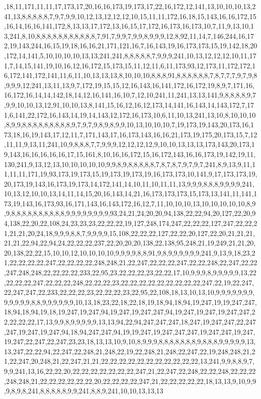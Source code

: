 ,18,11,171,11,11,17,173,17,20,16,16,173,19,173,17,22,16,172,12,141,13,10,10,10,13,241,13,8,8,8,8,8,7,9,7,9,9,10,12,13,12,12,12,10,15,11,11,172,16,18,15,143,16,16,172,15,16,14,16,16,141,172,8,13,13,17,172,13,16,15,17,172,16,173,16,173,10,7,11,9,13,10,13,241,8,10,8,8,8,8,8,8,8,8,8,8,8,7,91,7,9,9,7,9,9,8,9,9,9,12,8,92,11,14,7,146,244,16,172,19,143,244,16,15,19,18,16,16,21,171,121,16,7,16,143,19,16,173,173,15,19,142,18,20,172,14,141,5,10,10,10,10,13,13,241,241,8,8,8,8,8,7,9,9,9,241,10,13,12,12,12,10,11,171,7,14,15,141,19,10,16,12,16,172,15,173,15,11,12,11,6,11,173,93,12,173,11,172,172,16,172,141,172,141,11,6,11,10,13,13,13,8,10,10,10,8,8,8,91,8,8,8,8,8,8,7,8,7,7,7,9,7,9,8,9,9,9,12,241,13,11,13,9,7,172,19,15,15,12,16,143,16,141,172,16,172,19,8,9,7,171,16,16,172,16,14,14,142,18,14,12,16,141,16,10,7,12,10,241,11,241,13,13,141,9,8,8,8,8,9,7,9,9,10,10,13,12,91,10,10,13,8,141,15,16,12,16,12,173,14,141,16,143,14,143,172,7,171,6,141,22,172,16,143,14,19,14,143,12,172,16,173,10,6,11,10,13,241,13,10,8,10,10,10,8,9,9,8,8,8,8,8,8,8,8,8,9,7,9,7,9,8,9,8,9,9,10,13,10,10,10,7,19,173,19,143,20,173,16,173,18,16,19,143,17,12,11,7,171,143,17,16,173,143,16,16,21,173,19,175,20,173,15,7,12,11,11,9,13,11,241,10,9,8,8,8,7,7,9,9,9,12,12,12,12,9,10,10,13,13,13,173,143,20,173,19,143,16,16,16,16,16,17,15,161,8,10,16,16,172,15,16,172,143,16,16,173,19,142,19,11,130,241,9,13,12,13,10,10,10,10,10,9,9,8,9,8,8,8,8,8,7,8,7,8,7,9,7,9,7,241,8,9,13,9,11,11,11,11,171,19,93,173,19,173,15,19,173,19,173,19,16,173,173,10,141,9,17,173,173,19,20,173,19,143,16,173,19,173,14,172,141,14,10,11,10,11,11,13,9,9,9,8,8,8,9,9,9,9,241,10,13,12,10,10,13,14,11,14,15,20,16,143,14,21,16,173,173,173,15,173,13,141,11,141,173,19,143,16,173,93,16,171,143,16,143,172,16,12,7,11,10,10,10,13,10,10,10,10,10,8,9,9,8,8,8,8,8,8,8,8,8,8,9,9,9,9,9,9,9,9,93,24,21,24,20,20,94,138,22,22,94,20,127,22,20,94,138,22,20,22,108,24,23,23,23,22,22,22,19,127,248,174,247,22,22,22,127,247,22,22,21,21,21,20,24,18,9,9,9,8,8,7,9,9,9,9,15,108,22,22,22,127,22,22,20,127,22,20,21,21,21,21,21,22,94,22,94,24,22,22,22,237,22,20,20,20,138,22,138,95,248,21,19,249,21,21,20,20,138,22,22,15,10,10,12,10,10,10,10,9,9,9,9,8,8,91,9,8,9,9,9,9,9,9,241,9,13,9,18,23,21,22,22,22,22,247,22,22,22,22,248,248,21,22,247,22,22,22,247,22,22,248,22,247,22,22,247,248,248,22,22,22,22,233,22,95,23,22,22,22,23,22,22,17,10,9,9,9,8,9,9,9,9,9,13,22,22,22,22,247,22,22,22,248,22,22,22,23,22,22,22,22,22,22,22,22,22,247,22,19,22,247,22,247,247,22,233,22,22,22,23,22,22,22,23,22,95,22,108,18,13,10,13,10,9,9,9,9,9,9,9,9,9,9,9,9,8,8,9,9,9,9,9,9,10,13,18,23,22,18,22,18,19,18,94,18,94,19,247,19,19,247,247,18,94,18,94,19,18,19,247,19,247,94,19,247,19,247,247,94,19,247,19,247,19,247,247,22,22,22,22,17,13,9,9,8,9,9,9,9,9,13,13,94,22,94,247,247,247,18,247,19,247,247,22,247,247,19,247,19,247,94,18,94,247,247,94,19,19,247,19,247,247,247,19,247,247,19,247,19,247,22,247,22,247,23,23,18,13,13,10,9,10,8,9,9,9,8,8,8,8,8,8,8,9,8,8,8,9,9,9,9,9,13,13,247,22,22,94,22,247,22,248,21,248,22,19,22,248,21,248,22,247,22,19,248,248,21,21,22,247,20,248,21,22,247,21,21,22,22,22,22,22,22,22,22,22,22,22,13,241,9,9,8,8,9,7,9,9,241,13,16,22,22,20,22,22,22,22,22,22,22,247,21,22,247,22,248,22,22,248,22,22,22,248,248,21,22,22,22,22,22,22,20,22,22,22,22,247,21,22,22,22,22,22,18,13,13,9,10,9,9,9,8,9,8,241,8,8,8,8,8,9,9,241,8,8,9,241,10,10,13,13,13